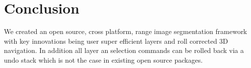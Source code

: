 



\section{Conclusion}

We created an open source, cross platform, range image segmentation framework with key innovations being user super efficient layers and roll corrected 3D navigation. In addition all layer an selection commands can be rolled back via a undo stack which is not the case in existing open source packages.




















